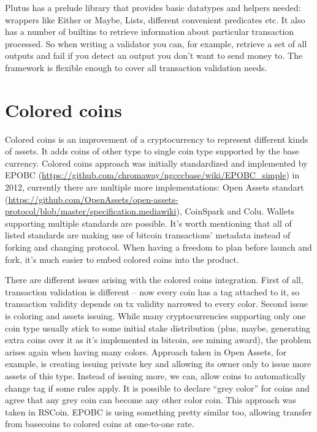 \documentclass[]{itmo-student-thesis}
\begin{document}
Plutus has a prelude library that provides basic datatypes and helpers
needed: wrappers like Either or Maybe, Lists, different convenient
predicates etc. It also has a number of builtins to retrieve
information about particular transaction processed. So when writing a
validator you can, for example, retrieve a set of all outputs and fail
if you detect an output you don’t want to send money to. The framework
is flexible enough to cover all transaction validation needs.

\section{Colored coins}

Colored coins is an improvement of a cryptocurrency to represent
different kinds of assets. It adds coins of other type to single coin
type supported by the base currency. Colored coins approach was
initially standardized and implemented by EPOBC
(\url{https://github.com/chromaway/ngcccbase/wiki/EPOBC_simple}) in
2012, currently there are multiple more implementations: Open Assets
standart
(\url{https://github.com/OpenAssets/open-assets-protocol/blob/master/specification.mediawiki}),
CoinSpark and Colu. Wallets supporting multiple standards are
possible. It’s worth mentioning that all of listed standards are
making use of bitcoin transactions’ metadata instead of forking and
changing protocol. When having a freedom to plan before launch and
fork, it’s much easier to embed colored coins into the product.

There are different issues arising with the colored coins
integration. First of all, transaction validation is different -- now
every coin has a tag attached to it, so transaction validity depends
on tx validity narrowed to every color. Second issue is coloring and
assets issuing. While many cryptocurrencies supporting only one coin
type usually stick to some initial stake distribution (plus, maybe,
generating extra coins over it as it’s implemented in bitcoin, see
mining award), the problem arises again when having many
colors. Approach taken in Open Assets, for example, is creating
issuing private key and allowing its owner only to issue more assets
of this type. Instead of issuing more, we can, allow coins to
automatically change tag if some rules apply. It is possible to
declare “grey color” for coins and agree that any grey coin can become
any other color coin. This approach was taken in RSCoin. EPOBC is
using something pretty similar too, allowing transfer from basecoins
to colored coins at one-to-one rate.
\end{document}

